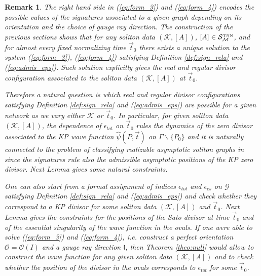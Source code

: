 \documentclass[11pt]{amsart}
\theoremstyle{plain}
\numberwithin{equation}{section}
\newtheorem{remark}{Remark}[subsection]
\def \S {{\mathcal S}_{\mathcal M}^{\mbox{\tiny TNN}}}
\begin{document}
\begin{remark}
The right hand side in (\ref{eq:form_3}) and (\ref{eq:form_4}) encodes the possible values of the signatures associated to a given graph depending on its orientation and the choice of gauge ray direction. The construction of the previous sections shows that for any soliton data $(\mathcal K, [A])$, $[A]\in \S$, and for almost every fixed normalizing time $\vec t_0$ there exists a unique solution to the system (\ref{eq:form_3}), (\ref{eq:form_4}) satisfying Definition \ref{def:sign_rela} and (\ref{eq:admis_eps}). Such solution explicitly gives the real and regular divisor configuration associated to the soliton data $(\mathcal K, [A])$ at $\vec t_0$. 

Therefore a natural question is which real and regular divisor configurations satisfying Definition \ref{def:sign_rela} and (\ref{eq:admis_eps}) are possible for a given network as we vary either $\mathcal K$ or $\vec t_0$. In particular, for given soliton data $(\mathcal K, [A])$, the dependence of $\epsilon_{tot}$ on $\vec t_0$ rules the dynamics of the zero divisor associated to the KP wave function $\hat \psi(P, \vec t)$ on $\Gamma\backslash \{ P_0\}$ and it is naturally connected to the problem of classifying realizable asymptotic soliton graphs in \cite{KW2} since the signatures rule also the admissible asymptotic positions of the KP zero divisor. Next Lemma gives some natural constraints.

One can also start from a formal assignment of indices $\epsilon_{tot}$ and $\epsilon_{cs}$ on $\mathcal G$ satisfying Definition \ref{def:sign_rela} and (\ref{eq:admis_eps}) and check whether they correspond to a KP divisor for some soliton data $(\mathcal K, [A])$ and $\vec t_0$. Next Lemma gives the constraints for the positions of the Sato divisor at time $\vec t_0$ and of the essential singularity of the wave function in the ovals. If one were able to solve (\ref{eq:form_3}) and (\ref{eq:form_4}), {\sl i.e.} construct a perfect orientation $\mathcal O=\mathcal O(I)$ and a gauge ray direction $\mathfrak{l}$, then Theorem \ref{theo:null} would allow to construct the wave function for any given soliton data $(\mathcal K, [A])$ and to check whether the position of the divisor in the ovals corresponds to $\epsilon_{tot}$ for some $\vec t_0$.
\end{remark}
\end{document}
